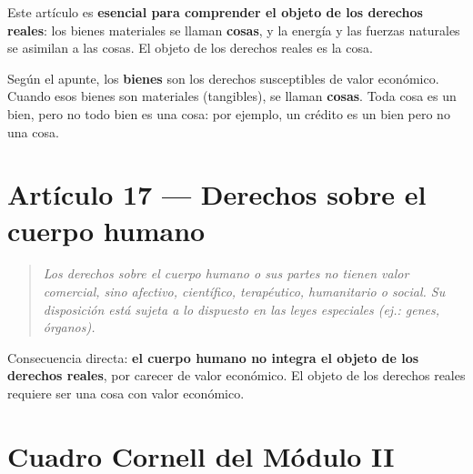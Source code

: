 \documentclass[12pt,oneside]{book}
\begin{document}
Este art\'iculo es \textbf{esencial para comprender el objeto de los derechos reales}: los bienes materiales se llaman \textbf{cosas}, y la energ\'ia y las fuerzas naturales se asimilan a las cosas. El objeto de los derechos reales es la cosa.

Seg\'un el apunte, los \textbf{bienes} son los derechos susceptibles de valor econ\'omico. Cuando esos bienes son materiales (tangibles), se llaman \textbf{cosas}. Toda cosa es un bien, pero no todo bien es una cosa: por ejemplo, un cr\'edito es un bien pero no una cosa.

\section{Art\'iculo 17 --- Derechos sobre el cuerpo humano}


\begin{quote}
\textit{Los derechos sobre el cuerpo humano o sus partes no tienen valor comercial, sino afectivo, cient\'ifico, terap\'eutico, humanitario o social. Su disposici\'on est\'a sujeta a lo dispuesto en las leyes especiales (ej.: genes, \'organos).}
\end{quote}

Consecuencia directa: \textbf{el cuerpo humano no integra el objeto de los derechos reales}, por carecer de valor econ\'omico. El objeto de los derechos reales requiere ser una cosa con valor econ\'omico.

\section{Cuadro Cornell del M\'odulo II}
\end{document}
